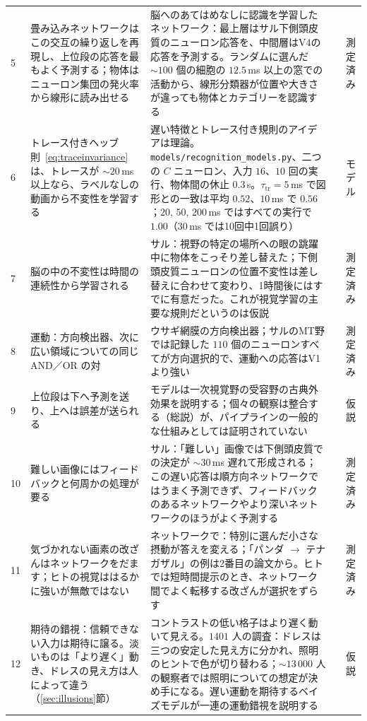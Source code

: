 {\begin{longtable}{>{\raggedright}p{0.5cm}>{\raggedright}p{4.0cm}>{\raggedright}p{5.6cm}>{\raggedright}p{2.3cm}>{\raggedright\arraybackslash}p{1.7cm}}
5 & 畳み込みネットワークはこの交互の繰り返しを再現し、上位段の応答を最もよく予測する；物体はニューロン集団の発火率から線形に読み出せる & 脳へのあてはめなしに認識を学習したネットワーク：最上層はサル下側頭皮質のニューロン応答を、中間層はV4の応答を予測する。ランダムに選んだ $\sim100$ 個の細胞の $12.5$\,ms 以上の窓での活動から、線形分類器が位置や大きさが違っても物体とカテゴリーを認識する & \cite{Fukushima1980,Yamins2014,Hung2005} & 測定済み \\
6 & トレース付きヘッブ則~\eqref{eq:traceinvariance}は、トレースが $\sim20$\,ms 以上なら、ラベルなしの動画から不変性を学習する & 遅い特徴とトレース付き規則のアイデアは理論。\texttt{models/\allowbreak recognition\_models.py}、二つの $C$ ニューロン、入力 $16$、$10$ 回の実行、物体間の休止 $0.3$\,s。$\tau_{\text{tr}}=5$\,ms で図形との一致は平均 $0.52$、$10$\,ms で $0.56$；$20$, $50$, $200$\,ms ではすべての実行で $1.00$（$30$\,ms では10回中1回誤り） & \cite{Foldiak1991,WiskottSejnowski2002} & モデル \\
7 & 脳の中の不変性は時間の連続性から学習される & サル：視野の特定の場所への眼の跳躍中に物体をこっそり差し替えた；下側頭皮質ニューロンの位置不変性は差し替えに合わせて変わり、1時間後にはすでに有意だった。これが視覚学習の主要な規則だというのは仮説 & \cite{LiDiCarlo2008} & 測定済み \\
8 & 運動：方向検出器、次に広い領域についての同じ AND／OR の対 & ウサギ網膜の方向検出器；サルのMT野では記録した $110$ 個のニューロンすべてが方向選択的で、運動への応答はV1より強い & \cite{Barlow1965,Albright1984} & 測定済み \\
9 & 上位段は下へ予測を送り、上へは誤差が送られる & モデルは一次視覚野の受容野の古典外効果を説明する；個々の観察は整合する（総説）が、パイプラインの一般的な仕組みとしては証明されていない & \cite{RaoBallard1999,Keller2018} & 仮説 \\
10 & 難しい画像にはフィードバックと何周かの処理が要る & サル：「難しい」画像では下側頭皮質での決定が $\sim30$\,ms 遅れて形成される；この遅い応答は順方向ネットワークではうまく予測できず、フィードバックのあるネットワークやより深いネットワークのほうがよく予測する & \cite{Kar2019} & 測定済み \\
11 & 気づかれない画素の改ざんはネットワークをだます；ヒトの視覚ははるかに強いが無敵ではない & ネットワークで：特別に選んだ小さな摂動が答えを変える；「パンダ $\to$ テナガザル」の例は2番目の論文から。ヒトでは短時間提示のとき、ネットワーク間でよく転移する改ざんが選択をずらす & \cite{Szegedy2014,Goodfellow2015,Elsayed2018} & 測定済み \\
12 & 期待の錯視：信頼できない入力は期待に譲る。淡いものは「より遅く」動き、ドレスの見え方は人によって違う（\ref{sec:illusions}節） & コントラストの低い格子はより遅く動いて見える。$1401$ 人の調査：ドレスは三つの安定した見え方に分かれ、照明のヒントで色が切り替わる；$\sim13\,000$ 人の観察者では照明についての想定が決め手になる。遅い運動を期待するベイズモデルが一連の運動錯視を説明する & \cite{Thompson1982,LaferSousa2015,Wallisch2017,Weiss2002,Purves2011} & 仮説 \\

\end{longtable}}
